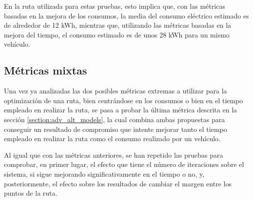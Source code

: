 \documentclass[11pt,spanish,listoffigures,listoftables]{tfgetsinf}
\begin{document}
En la ruta utilizada para estas pruebas, esto implica que, con las métricas basadas en la mejora de los consumos, la media del consumo eléctrico estimado es de alrededor de 12 kWh, mientras que, utilizando las métricas basadas en la mejora del tiempo, el consumo estimado es de unos 28 kWh para un mismo vehículo.

\newpage
\subsection{Métricas mixtas}
\label{section:mix_model_tests}
Una vez ya analizadas las dos posibles métricas extremas a utilizar para la optimización de una ruta, bien centrándose en los consumos o bien en el tiempo empleado en realizar la ruta, se pasa a probar la última métrica descrita en la sección \ref{section:adv_alt_models}, la cual combina ambas propuestas para conseguir un resultado de compromiso que intente mejorar tanto el tiempo empleado en realizar la ruta como el consumo realizado por un vehículo.

Al igual que con las métricas anteriores, se han repetido las pruebas para comprobar, en primer lugar, el efecto que tiene el número de iteraciones sobre el sistema, si sigue mejorando significativamente en el tiempo o no, y, posteriormente, el efecto sobre los resultados de cambiar el margen entre los puntos de la ruta.
\end{document}
